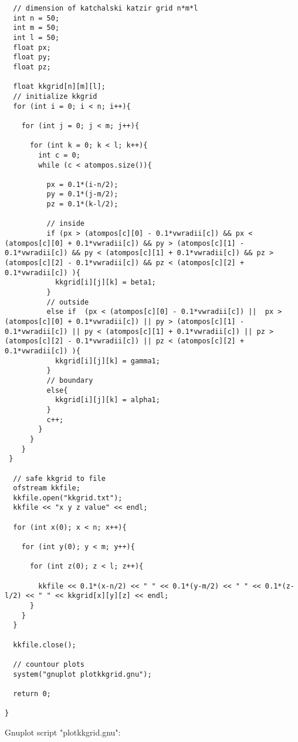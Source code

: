 \documentclass[11pt]{article}
\begin{document}
\begin{lstlisting}
  // dimension of katchalski katzir grid n*m*l
  int n = 50;
  int m = 50;
  int l = 50;
  float px;
  float py;
  float pz;

  float kkgrid[n][m][l];
  // initialize kkgrid
  for (int i = 0; i < n; i++){

    for (int j = 0; j < m; j++){

      for (int k = 0; k < l; k++){
        int c = 0;
        while (c < atompos.size()){

          px = 0.1*(i-n/2);
          py = 0.1*(j-m/2);
          pz = 0.1*(k-l/2);

          // inside 
          if (px > (atompos[c][0] - 0.1*vwradii[c]) && px < (atompos[c][0] + 0.1*vwradii[c]) && py > (atompos[c][1] - 0.1*vwradii[c]) && py < (atompos[c][1] + 0.1*vwradii[c]) && pz > (atompos[c][2] - 0.1*vwradii[c]) && pz < (atompos[c][2] + 0.1*vwradii[c]) ){
            kkgrid[i][j][k] = beta1;
          }
          // outside
          else if  (px < (atompos[c][0] - 0.1*vwradii[c]) ||  px > (atompos[c][0] + 0.1*vwradii[c]) || py > (atompos[c][1] - 0.1*vwradii[c]) || py < (atompos[c][1] + 0.1*vwradii[c]) || pz > (atompos[c][2] - 0.1*vwradii[c]) || pz < (atompos[c][2] + 0.1*vwradii[c]) ){
            kkgrid[i][j][k] = gamma1;
          }
          // boundary
          else{
            kkgrid[i][j][k] = alpha1;
          }
          c++;
        }
      }  
    }
 }

  // safe kkgrid to file
  ofstream kkfile;
  kkfile.open("kkgrid.txt");
  kkfile << "x y z value" << endl;

  for (int x(0); x < n; x++){

    for (int y(0); y < m; y++){

      for (int z(0); z < l; z++){

        kkfile << 0.1*(x-n/2) << " " << 0.1*(y-m/2) << " " << 0.1*(z-l/2) << " " << kkgrid[x][y][z] << endl; 
      }
    }
  }

  kkfile.close();

  // countour plots
  system("gnuplot plotkkgrid.gnu");

  return 0;

}

\end{lstlisting}


Gnuplot script "plotkkgrid.gnu":
\end{document}
